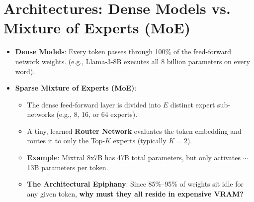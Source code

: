 \documentclass[11pt,a4paper]{article}
\begin{document}
\section{Architectures: Dense Models vs. Mixture of Experts (MoE)}
\begin{itemize}
    \item \textbf{Dense Models}: Every token passes through 100\% of the feed-forward network weights. (e.g., Llama-3-8B executes all 8 billion parameters on every word).
    \item \textbf{Sparse Mixture of Experts (MoE)}:
    \begin{itemize}
        \item The dense feed-forward layer is divided into $E$ distinct expert sub-networks (e.g., 8, 16, or 64 experts).
        \item A tiny, learned \textbf{Router Network} evaluates the token embedding and routes it to only the Top-$K$ experts (typically $K=2$).
        \item \textbf{Example}: Mixtral 8x7B has 47B total parameters, but only activates $\sim$13B parameters per token.
        \item \textbf{The Architectural Epiphany}: Since 85\%--95\% of weights sit idle for any given token, \textbf{why must they all reside in expensive VRAM?}
    \end{itemize}
\end{itemize}

\end{document}
